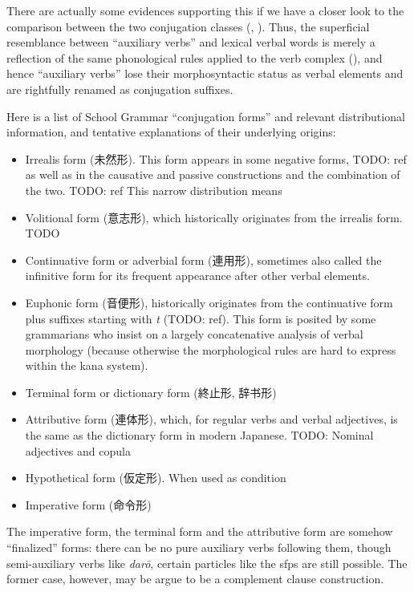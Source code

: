 \documentclass[UTF8, a4paper, oneside, scheme=plain]{ctexart}
\newcommand{\corpus}[1]{\emph{#1}}
\begin{document}
There are actually some evidences supporting this
if we have a closer look to the comparison between the two conjugation classes 
(, ).
Thus, the superficial resemblance between ``auxiliary verbs'' and lexical verbal words 
is merely a reflection of the same phonological rules applied to the verb complex
(),
and hence ``auxiliary verbs'' lose their morphosyntactic status as verbal elements 
and are rightfully renamed as conjugation suffixes.

Here is a list of School Grammar ``conjugation forms'' and relevant distributional information,
and tentative explanations of their underlying origins:
\begin{itemize}
    \item Irrealis form (未然形). 
    This form appears in some negative forms, TODO: ref
    as well as in the causative and passive constructions 
    and the combination of the two. TODO: ref
    This narrow distribution means 
    \item Volitional form (意志形), which historically originates from the irrealis form. TODO
    \item Continuative form or adverbial form (連用形), 
    sometimes also called the infinitive form
    for its frequent appearance after other verbal elements.
    \item Euphonic form (音便形), 
    historically originates from the continuative form plus suffixes starting with \corpus{t}
    (TODO: ref).
    This form is posited by some grammarians 
    who insist on a largely concatenative analysis of verbal morphology 
    (because otherwise the morphological rules are hard to express within the kana system).
    \item Terminal form or dictionary form (終止形, 辞书形)
    \item Attributive form (連体形), which, for regular verbs and verbal adjectives, 
    is the same as the dictionary form in modern Japanese.
    TODO: Nominal adjectives and copula 
    \item Hypothetical form (仮定形). When used as condition
    \item Imperative form (命令形)
\end{itemize}
The imperative form, the terminal form and the attributive form are somehow ``finalized'' forms: 
there can be no pure auxiliary verbs following them,
though semi-auxiliary verbs like \corpus{dar\={o}}, certain particles like the \ac{sfp}s are still possible.
The former case, however, may be argue to be a complement clause construction.
\end{document}
